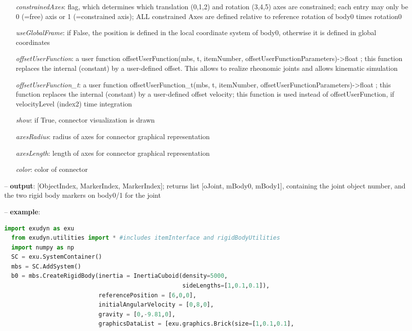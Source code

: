 \begin{itemize}[leftmargin=0.7cm]
\begin{itemize}[leftmargin=1.2cm]
\item[]{\it constrainedAxes}: flag, which determines which translation (0,1,2) and rotation (3,4,5) axes are constrained; each entry may only be 0 (=free) axis or 1 (=constrained axis); ALL constrained Axes are defined relative to reference rotation of body0 times rotation0
\item[]{\it useGlobalFrame}: if False, the position is defined in the local coordinate system of body0, otherwise it is defined in global coordinates
\item[]{\it offsetUserFunction}: a user function offsetUserFunction(mbs, t, itemNumber, offsetUserFunctionParameters)->float ; this function replaces the internal (constant) by a user-defined offset. This allows to realize rheonomic joints and allows kinematic simulation
\item[]{\it offsetUserFunction\_t}: a user function offsetUserFunction\_t(mbs, t, itemNumber, offsetUserFunctionParameters)->float ; this function replaces the internal (constant) by a user-defined offset velocity; this function is used instead of offsetUserFunction, if velocityLevel (index2) time integration
\item[]{\it show}: if True, connector visualization is drawn
\item[]{\it axesRadius}: radius of axes for connector graphical representation
\item[]{\it axesLength}: length of axes for connector graphical representation
\item[]{\it color}: color of connector
\end{itemize}
\item[--]
{\bf output}: [ObjectIndex, MarkerIndex, MarkerIndex]; returns list [oJoint, mBody0, mBody1], containing the joint object number, and the two rigid body markers on body0/1 for the joint
\item[--]
{\bf example}: \vspace{-12pt}\ei\begin{lstlisting}[language=Python, xleftmargin=36pt]
  import exudyn as exu
  from exudyn.utilities import * #includes itemInterface and rigidBodyUtilities
  import numpy as np
  SC = exu.SystemContainer()
  mbs = SC.AddSystem()
  b0 = mbs.CreateRigidBody(inertia = InertiaCuboid(density=5000,
                                                   sideLengths=[1,0.1,0.1]),
                           referencePosition = [6,0,0],
                           initialAngularVelocity = [0,8,0],
                           gravity = [0,-9.81,0],
                           graphicsDataList = [exu.graphics.Brick(size=[1,0.1,0.1],

\end{lstlisting}
\end{itemize}
